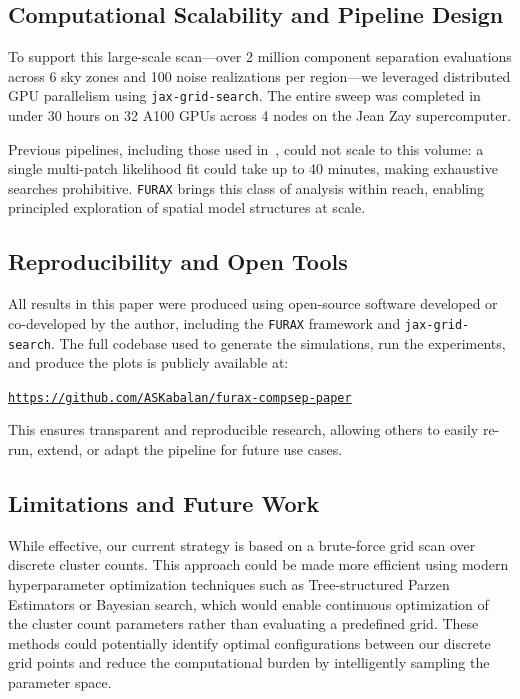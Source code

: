 \documentclass[fleqn,usenatbib]{mnras}
\begin{document}
\subsection*{Computational Scalability and Pipeline Design}

To support this large-scale scan---over 2 million component separation evaluations across 6 sky zones and 100 noise realizations per region---we leveraged distributed GPU parallelism using \texttt{jax-grid-search}. The entire sweep was completed in under 30 hours on 32 A100 GPUs across 4 nodes on the Jean Zay supercomputer.

Previous pipelines, including those used in~\cite{LiteBIRD_PTEP_2022}, could not scale to this volume: a single multi-patch likelihood fit could take up to 40 minutes, making exhaustive searches prohibitive. \texttt{FURAX} brings this class of analysis within reach, enabling principled exploration of spatial model structures at scale.

\subsection*{Reproducibility and Open Tools}

All results in this paper were produced using open-source software developed or co-developed by the author, including the \texttt{FURAX} framework and \texttt{jax-grid-search}. The full codebase used to generate the simulations, run the experiments, and produce the plots is publicly available at:

\begin{center}
\texttt{\href{https://github.com/ASKabalan/furax-compsep-paper}{https://github.com/ASKabalan/furax-compsep-paper}}
\end{center}

This ensures transparent and reproducible research, allowing others to easily re-run, extend, or adapt the pipeline for future use cases.

\subsection*{Limitations and Future Work}

While effective, our current strategy is based on a brute-force grid scan over discrete cluster counts. This approach could be made more efficient using modern hyperparameter optimization techniques such as Tree-structured Parzen Estimators or Bayesian search, which would enable continuous optimization of the cluster count parameters rather than evaluating a predefined grid. These methods could potentially identify optimal configurations between our discrete grid points and reduce the computational burden by intelligently sampling the parameter space.
\end{document}
